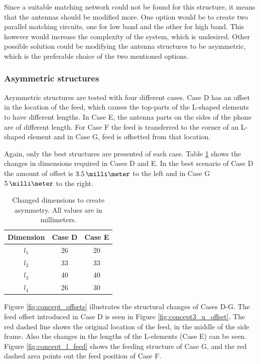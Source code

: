 Since a suitable matching network could not be found for this structure, it means that the antennas should be modified more. One option would be to create two parallel matching circuits, one for low band and the other for high band. This however would increase the complexity of the system, which is undesired. Other possible solution could be modifying the antenna structures to be asymmetric, which is the preferable choice of the two mentioned options.


\subsubsection{Asymmetric structures}
\label{sec:asymmetric_structures}
Asymmetric structures are tested with four different cases. Case D has an offset in the location of the feed, which causes the top-parts of the L-shaped elements to have different lengths. In Case E, the antenna parts on the sides of the phone are of different length. For Case F the feed is transferred to the corner of an L-shaped element and in Case G, feed is offsetted from that location.

Again, only the best structures are presented of each case. Table \ref{tab:concept3} shows the changes in dimensions required in Cases D and E. In the best scenario of Case D the amount of offset is $3.5\,\milli\meter$ to the left and in Case G $5\,\milli\meter$ to the right. 
\begin{table}[H]
    \centering
    \caption{Changed dimensions to create asymmetry. All values are in millimeters.}
    \label{tab:concept3}
    \begin{tabular}{|c|c|c|}
        \hline
        \textbf{Dimension} & \textbf{Case D} & \textbf{Case E}\\
        \hline
        $l_1$ & 26 & 20 \\
        \hline
        $l_2$ & 33 & 33\\
        \hline
        $l_3$ & 40 & 40\\
        \hline
        $l_4$ & 26 & 30\\
        \hline
    \end{tabular}
\end{table}

Figure \ref{fig:concept_offsets} illustrates the structural changes of Cases D-G. The feed offset introduced in Case D is seen in Figure \ref{fig:concept3_u_offset}. The red dashed line shows the original location of the feed, in the middle of the side frame. Also the changes in the lengths of the L-elements (Case E) can be seen. Figure \ref{fig:concept_l_feed} shows the feeding structure of Case G, and the red dashed area points out the feed position of Case F.

